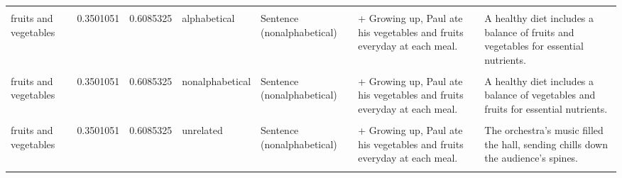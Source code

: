 \documentclass[
  12pt,
]{scrartcl}
\begin{document}
\begin{landscape}
\begin{longtable}{lrrllll}
\cellcolor{gray!6}{fruits and vegetables} & \cellcolor{gray!6}{0.3501051} & \cellcolor{gray!6}{0.6085325} & \cellcolor{gray!6}{alphabetical} & \cellcolor{gray!6}{Sentence (alphabetical)} & \cellcolor{gray!6}{+ Growing up, Paul ate his fruits and vegetables everyday at each meal.} & \cellcolor{gray!6}{A healthy diet includes a balance of fruits and vegetables for essential nutrients.}\\
fruits and vegetables & 0.3501051 & 0.6085325 & alphabetical & Sentence (nonalphabetical) & + Growing up, Paul ate his vegetables and fruits everyday at each meal. & A healthy diet includes a balance of fruits and vegetables for essential nutrients.\\
\cellcolor{gray!6}{fruits and vegetables} & \cellcolor{gray!6}{0.3501051} & \cellcolor{gray!6}{0.6085325} & \cellcolor{gray!6}{nonalphabetical} & \cellcolor{gray!6}{Sentence (alphabetical)} & \cellcolor{gray!6}{+ Growing up, Paul ate his fruits and vegetables everyday at each meal.} & \cellcolor{gray!6}{A healthy diet includes a balance of vegetables and fruits for essential nutrients.}\\
fruits and vegetables & 0.3501051 & 0.6085325 & nonalphabetical & Sentence (nonalphabetical) & + Growing up, Paul ate his vegetables and fruits everyday at each meal. & A healthy diet includes a balance of vegetables and fruits for essential nutrients.\\
\addlinespace
\cellcolor{gray!6}{fruits and vegetables} & \cellcolor{gray!6}{0.3501051} & \cellcolor{gray!6}{0.6085325} & \cellcolor{gray!6}{unrelated} & \cellcolor{gray!6}{Sentence (alphabetical)} & \cellcolor{gray!6}{+ Growing up, Paul ate his fruits and vegetables everyday at each meal.} & \cellcolor{gray!6}{The orchestra's music filled the hall, sending chills down the audience's spines.}\\
fruits and vegetables & 0.3501051 & 0.6085325 & unrelated & Sentence (nonalphabetical) & + Growing up, Paul ate his vegetables and fruits everyday at each meal. & The orchestra's music filled the hall, sending chills down the audience's spines.\\
\cellcolor{gray!6}{blood and flesh} & \cellcolor{gray!6}{-0.4736040} & \cellcolor{gray!6}{0.4690761} & \cellcolor{gray!6}{alphabetical} & \cellcolor{gray!6}{Sentence (alphabetical)} & \cellcolor{gray!6}{+ Although Rhonda was not Nick's blood and flesh he considered her family.} & \cellcolor{gray!6}{The battle left marks of blood and flesh on the ground, a grim reminder of its toll.}\\

\end{longtable}
\end{landscape}
\end{document}
